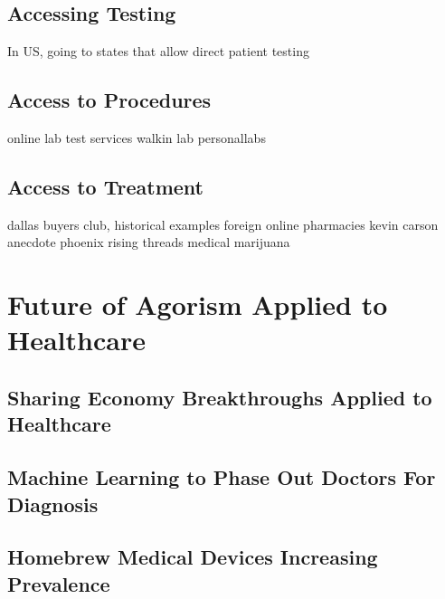 \documentclass{article}
\begin{document}

\subsection{Accessing Testing}

In US, going to states that allow direct patient testing

\subsection{Access to Procedures}



online lab test services
walkin lab
personallabs


\subsection{Access to Treatment}

dallas buyers club, historical examples
foreign online pharmacies
kevin carson anecdote
phoenix rising threads
medical marijuana

\section{Future of Agorism Applied to Healthcare}

\subsection{Sharing Economy Breakthroughs Applied to Healthcare}


\subsection{Machine Learning to Phase Out Doctors For Diagnosis}

\subsection{Homebrew Medical Devices Increasing Prevalence}
\end{document}
